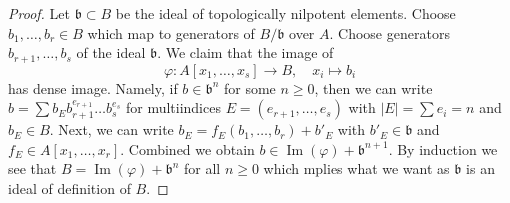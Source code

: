 \documentclass[10pt,a4paper]{amsart}
\theoremstyle{plain}
\theoremstyle{definition}
\theoremstyle{remark}
\numberwithin{equation}{subsection}
\def\Im{\mathop{\mathrm{Im}}}
\begin{document}
\begin{proof}
Let $\mathfrak b \subset B$ be the
ideal of topologically nilpotent elements. Choose $b_1, \ldots, b_r \in B$
which map to generators of $B/\mathfrak b$ over $A$.
Choose generators $b_{r + 1}, \ldots, b_s$ of the ideal
$\mathfrak b$. We claim that the image of
$$
\varphi : A[x_1, \ldots, x_s] \longrightarrow B, \quad
x_i \longmapsto b_i
$$
has dense image. Namely, if $b \in \mathfrak b^n$ for some $n \geq 0$,
then we can write
$b = \sum b_E b_{r + 1}^{e_{r + 1}} \ldots b_s^{e_s}$ for multiindices
$E = (e_{r + 1}, \ldots, e_s)$ with $|E| = \sum e_i = n$ and $b_E \in B$.
Next, we can write $b_E = f_E(b_1, \ldots, b_r) + b'_E$
with $b'_E \in \mathfrak b$ and $f_E \in A[x_1, \ldots, x_r]$.
Combined we obtain $b \in \Im(\varphi) + \mathfrak b^{n + 1}$.
By induction we see that $B = \Im(\varphi) + \mathfrak b^n$ for all
$n \geq 0$ which mplies what we want as $\mathfrak b$ is an ideal
of definition of $B$.
\end{proof}
\end{document}
